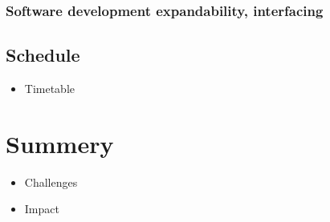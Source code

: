 \documentclass[a4paper,11pt]{article}
\begin{document}
\subsubsection{Software development expandability, interfacing}
\subsection{Schedule}
\begin{itemize}
\item Timetable
\end{itemize}

\section{Summery}
\label{sec:summery}
\begin{itemize}
\item Challenges
\item Impact
\end{itemize}




\end{document}
